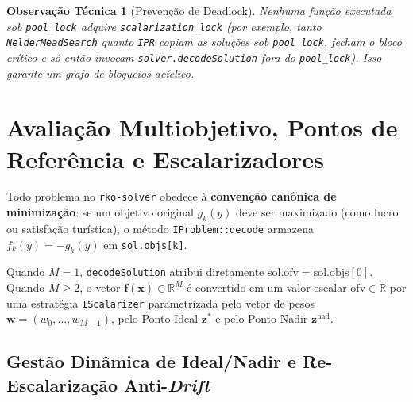 \documentclass[11pt,a4paper]{article}
\newtheorem{remark}{Observação Técnica}[section]
\begin{document}
\begin{remark}[Prevenção de Deadlock]
Nenhuma função executada sob \texttt{pool\_lock} adquire \texttt{scalarization\_lock} (por exemplo, tanto \texttt{NelderMeadSearch} quanto \texttt{IPR} copiam as soluções sob \texttt{pool\_lock}, fecham o bloco crítico e só então invocam \texttt{solver.decodeSolution} fora do \texttt{pool\_lock}). Isso garante um grafo de bloqueios acíclico.
\end{remark}

\section{Avaliação Multiobjetivo, Pontos de Referência e Escalarizadores}
\label{sec:escalarizacao}

Todo problema no \texttt{rko-solver} obedece à \textbf{convenção canônica de minimização}: se um objetivo original $g_k(y)$ deve ser maximizado (como lucro ou satisfação turística), o método \texttt{IProblem::decode} armazena $f_k(y) = -g_k(y)$ em \texttt{sol.objs[k]}.

Quando $M = 1$, \texttt{decodeSolution} atribui diretamente $\text{sol.ofv} = \text{sol.objs}[0]$. Quando $M \ge 2$, o vetor $\mathbf{f}(\mathbf{x}) \in \mathbb{R}^M$ é convertido em um valor escalar $\text{ofv} \in \mathbb{R}$ por uma estratégia \texttt{IScalarizer} parametrizada pelo vetor de pesos $\mathbf{w} = (w_0, \dots, w_{M-1})$, pelo Ponto Ideal $\mathbf{z}^*$ e pelo Ponto Nadir $\mathbf{z}^{\text{nad}}$.

\subsection{Gestão Dinâmica de Ideal/Nadir e Re-Escalarização Anti-\emph{Drift}}
\end{document}
